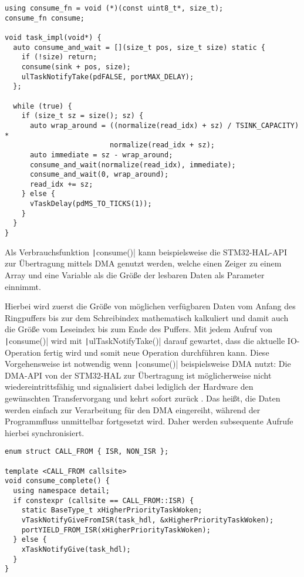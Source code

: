 \begin{code}
\begin{verbatim}
using consume_fn = void (*)(const uint8_t*, size_t);
consume_fn consume;

void task_impl(void*) {
  auto consume_and_wait = [](size_t pos, size_t size) static {
    if (!size) return;
    consume(sink + pos, size);
    ulTaskNotifyTake(pdFALSE, portMAX_DELAY);
  };

  while (true) {
    if (size_t sz = size(); sz) {
      auto wrap_around = ((normalize(read_idx) + sz) / TSINK_CAPACITY) *
                         normalize(read_idx + sz);
      auto immediate = sz - wrap_around;
      consume_and_wait(normalize(read_idx), immediate);
      consume_and_wait(0, wrap_around);
      read_idx += sz;
    } else {
      vTaskDelay(pdMS_TO_TICKS(1));
    }
  }
}
\end{verbatim}
\end{code}

Als Verbrauchsfunktion \texttt|consume()| kann beispielsweise die
STM32-HAL-API zur Übertragung mittels DMA genutzt werden, welche einen Zeiger
zu einem Array und eine Variable als die Größe der lesbaren Daten als Parameter
einnimmt.

Hierbei wird zuerst die Größe von möglichen verfügbaren Daten vom Anfang des
Ringpuffers bis zur dem Schreibindex mathematisch kalkuliert und damit auch die
Größe vom Leseindex bis zum Ende des Puffers. Mit jedem Aufruf von
\texttt|consume()| wird mit \texttt|ulTaskNotifyTake()| darauf
gewartet, dass die aktuelle IO-Operation fertig wird und somit neue Operation
durchführen kann. Diese Vorgehensweise ist notwendig wenn
\texttt|consume()| beispielsweise DMA nutzt: Die DMA-API von der
STM32-HAL zur Übertragung ist möglicherweise nicht wiedereintrittsfähig und
signalisiert dabei lediglich der Hardware den gewünschten Transfervorgang und
kehrt sofort zurück \cite{HAL_UART_Transmit_DMA}. Das heißt, die Daten werden
einfach zur Verarbeitung für den DMA eingereiht, während der Programmfluss
unmittelbar fortgesetzt wird. Daher werden subsequente Aufrufe hierbei
synchronisiert.

\begin{code}
\begin{verbatim}
enum struct CALL_FROM { ISR, NON_ISR };

template <CALL_FROM callsite>
void consume_complete() {
  using namespace detail;
  if constexpr (callsite == CALL_FROM::ISR) {
    static BaseType_t xHigherPriorityTaskWoken;
    vTaskNotifyGiveFromISR(task_hdl, &xHigherPriorityTaskWoken);
    portYIELD_FROM_ISR(xHigherPriorityTaskWoken);
  } else {
    xTaskNotifyGive(task_hdl);
  }
}
\end{verbatim}
\end{code}

